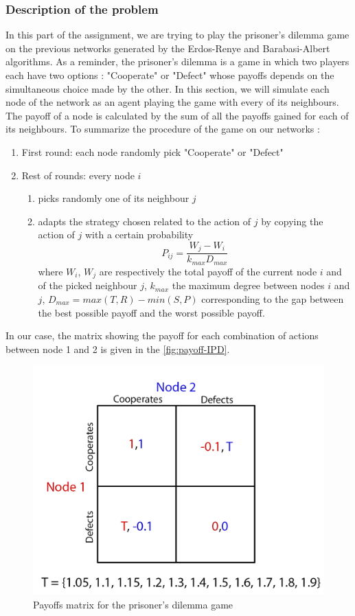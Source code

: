 \documentclass{article}
\begin{document}
\subsubsection{Description of the problem}
In this part of the assignment, we are trying to play the prisoner's dilemma game on the previous networks generated by the Erdos-Renye and Barabasi-Albert algorithms. As a reminder, the prisoner's dilemma is a game in which two players each have two options : "Cooperate" or "Defect" whose payoffs depends on the simultaneous choice made by the other. In this section, we will simulate each node of the network as an agent playing the game with every of its neighbours. The payoff of a node is calculated by the sum of all the payoffs gained for each of its neighbours. To summarize the procedure of the game on our networks : 
\begin{enumerate}
\item First round: each node randomly pick "Cooperate" or "Defect" 
\item Rest of rounds: every node $i$
\begin{enumerate}
\item picks randomly one of its neighbour $j$
\item adapts the strategy chosen related to the action of $j$ by copying the action of $j$  with a certain probability $$ P_{ij} = \frac{W_{j}-W_{i}}{k_{max} D_{max}} $$ where $W_{i}$, $W_{j}$ are respectively the total payoff of the current node $i$ and of the picked neighbour $j$, $k_{max}$ the maximum degree between nodes $i$ and $j$, $D_{max} = max(T,R) - min(S,P)$ corresponding to the gap between the best possible payoff and the worst possible payoff.  
\end{enumerate} 
\end{enumerate}  

In our case, the matrix showing the payoff for each combination of actions between node 1 and 2 is given in the \autoref{fig:payoff-IPD}.
 
\begin{figure}[h]
  \centering
  \includegraphics[scale=0.9]{fig/payoff-IPD.png}
  \caption{Payoffs matrix for the prisoner's dilemma game}
  \label{fig:payoff-IPD}
\end{figure}
\end{document}
